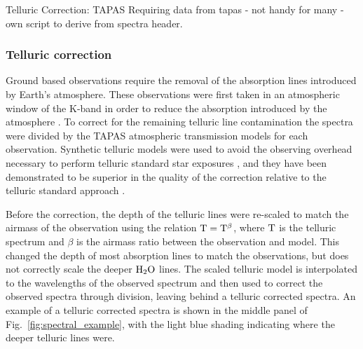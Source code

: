 



Telluric Correction:
TAPAS
Requiring data from tapas
- not handy for many
- own script to derive from spectra header.


\subsubsection{Telluric correction}
\label{subsec:telluric_correction}
Ground based observations require the removal of the absorption lines introduced by Earth's atmosphere. These observations were first taken in an atmospheric window of the K-band in order to reduce the absorption introduced by the atmosphere \citep{barnes_hd_2008}. To correct for the remaining telluric line contamination the spectra were divided by the TAPAS\citep{bertaux_tapas_2014} atmospheric transmission models for each observation. Synthetic telluric models were used to avoid the observing overhead necessary to perform telluric standard star exposures \citep{vacca_method_2003}, and they have been demonstrated to be superior in the quality of the correction relative to the telluric standard approach \citep[e.g.][]{cotton_atmospheric_2014}.

Before the correction, the depth of the telluric lines were re-scaled to match the airmass of the observation using the relation \(\rm T = T^{\beta} \), where \(\rm T\) is the telluric spectrum and \(\beta \) is the airmass ratio between the observation and model. This changed the depth of most absorption lines to match the observations, but does not correctly scale the deeper \(\rm H_{2}O \) lines. The scaled telluric model is interpolated to the wavelengths of the observed spectrum and then used to correct the observed spectra through division, leaving behind a telluric corrected spectra. An example of a telluric corrected spectra is shown in the middle panel of Fig.~\ref{fig:spectral_example}, with the light blue shading indicating where the deeper telluric lines were.

